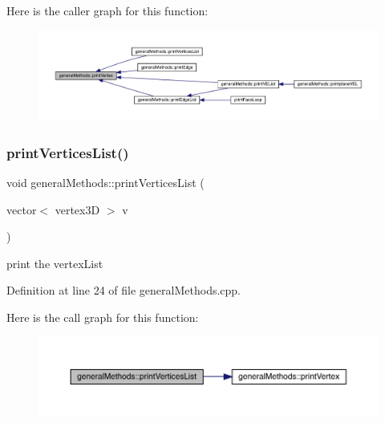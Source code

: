 Here is the caller graph for this function\+:
\nopagebreak
\begin{figure}[H]
\begin{center}
\leavevmode
\includegraphics[width=350pt]{namespacegeneral_methods_a694306c7472ee1bbfb3c90c0f3d5453a_icgraph}
\end{center}
\end{figure}
\mbox{\label{namespacegeneral_methods_a9cbf7d7c2019f0e2b6f9773b687b50cd}} 
\subsubsection{\texorpdfstring{print\+Vertices\+List()}{printVerticesList()}}
{\footnotesize\ttfamily void general\+Methods\+::print\+Vertices\+List (\begin{DoxyParamCaption}\item[{vector$<$ vertex3D $>$}]{v }\end{DoxyParamCaption})}

print the vertex\+List

Definition at line 24 of file general\+Methods.\+cpp.

Here is the call graph for this function\+:
\nopagebreak
\begin{figure}[H]
\begin{center}
\leavevmode
\includegraphics[width=350pt]{namespacegeneral_methods_a9cbf7d7c2019f0e2b6f9773b687b50cd_cgraph}
\end{center}
\end{figure}
\mbox{\label{namespacegeneral_methods_a9258a7b34f46d6c0b38723a700507535}} 
